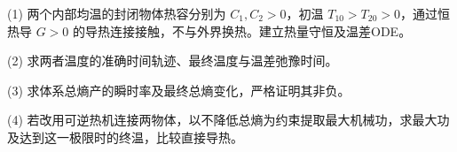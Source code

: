 (1) 两个内部均温的封闭物体热容分别为 \(C_1,C_2>0\)，初温 \(T_{10}>T_{20}>0\)，通过恒热导 \(G>0\) 的导热连接接触，不与外界换热。建立热量守恒及温差ODE。

(2) 求两者温度的准确时间轨迹、最终温度与温差弛豫时间。

(3) 求体系总熵产的瞬时率及最终总熵变化，严格证明其非负。

(4) 若改用可逆热机连接两物体，以不降低总熵为约束提取最大机械功，求最大功及达到这一极限时的终温，比较直接导热。
